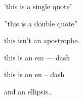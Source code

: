 
\def\mytitle{MultiMarkdown Swedish Test}


'this is a single quote'

''this is a double quote''

this isn't an apostrophe.

this is an em --- dash

this is an en -- dash

and an ellipsis{\ldots}




